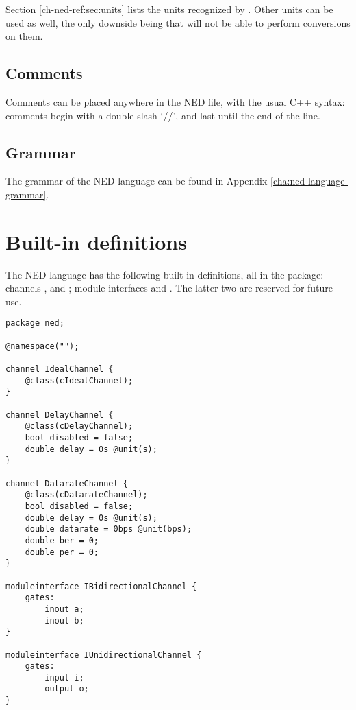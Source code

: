 Section \ref{ch-ned-ref:sec:units} lists the units recognized by {\opp}.
Other units can be used as well, the only downside being that {\opp} will not be
able to perform conversions on them.


\subsection{Comments}

Comments can be placed anywhere in the NED file, with the usual C++
syntax: comments begin with a double slash `//', and last until
the end of the line.


\subsection{Grammar}

The grammar of the NED language can be found in Appendix
\ref{cha:ned-language-grammar}.

\section{Built-in definitions}
\label{ch-ned-ref:sec:built-in-defs}

The NED language has the following built-in definitions, all in the 
package: channels  , and ;
module interfaces  and .
The latter two are reserved for future use.

\begin{verbatim}
package ned;

@namespace("");

channel IdealChannel {
    @class(cIdealChannel);
}

channel DelayChannel {
    @class(cDelayChannel);
    bool disabled = false;
    double delay = 0s @unit(s);
}

channel DatarateChannel {
    @class(cDatarateChannel);
    bool disabled = false;
    double delay = 0s @unit(s);
    double datarate = 0bps @unit(bps);
    double ber = 0;
    double per = 0;
}

moduleinterface IBidirectionalChannel {
    gates:
        inout a;
        inout b;
}

moduleinterface IUnidirectionalChannel {
    gates:
        input i;
        output o;
}
\end{verbatim}



